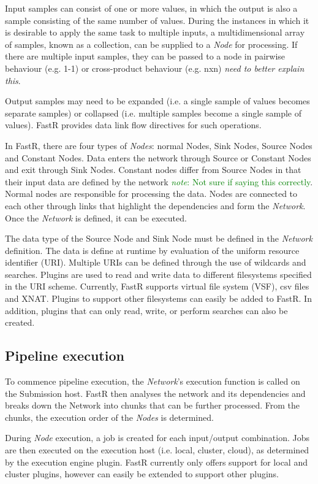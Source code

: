 \documentclass{report}
\newcommand{\note}[1]{\textcolor{green}{\textit{note}: #1}}
\begin{document}
Input samples can consist of one or more values, in which the output is also a
sample consisting of the same number of values. During the instances in which it
is desirable to apply the same task to multiple inputs, a multidimensional array of samples, known as a collection, can be supplied to a
\textit{Node} for processing. If there are multiple input samples, they can be
passed to a node in pairwise behaviour (e.g. 1-1) or cross-product behaviour
(e.g. nxn) \textit{need to better explain this}.  

Output samples may need to be expanded (i.e. a single sample of values becomes separate
samples) or collapsed (i.e. multiple samples become a single sample of values).
FastR provides data link flow directives for such operations.

In FastR, there are four types of \textit{Nodes}: normal Nodes, Sink Nodes,
Source Nodes and Constant Nodes. Data enters the network through Source or
Constant Nodes and exit through Sink Nodes. Constant nodes differ from Source
Nodes in that their input data are defined by the network \note{Not sure if
saying this correctly}. Normal nodes are responsible for processing the
data. Nodes are connected to each other through links that highlight the
dependencies and form the \textit{Network}. Once the \textit{Network} is
defined, it can be executed.

The data type of the Source Node and Sink Node must be defined in the
\textit{Network} definition.
The data is define at runtime by evaluation of the uniform resource identifier
(URI). Multiple URIs can be defined through the use of wildcards and searches. Plugins are used to read and write data to
different filesystems specified in the URI scheme. Currently, FastR supports
virtual file system (VSF), csv files and XNAT. Plugins to support other
filesystems can easily be added to FastR. In addition, plugins that can only
read, write, or perform searches can also be created.   


        \subsection{Pipeline execution}
        To commence pipeline execution, the \textit{Network}'s execution
function is called on the Submission host. FastR then analyses the network and
its dependencies and breaks
down the Network into chunks that can be further processed. From the chunks, the
execution order of the \textit{Nodes} is determined. 

During \textit{Node} execution, a job is created for each input/output
combination. Jobs are then executed on the execution host (i.e. local, cluster,
cloud), as determined by the execution engine plugin. FastR currently only
offers support for local and cluster plugins, however can easily be extended to
support other plugins. 
\end{document}
